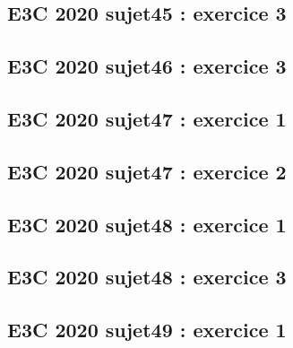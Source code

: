 \documentclass[lang=fr,edition=teacher,layout=sheet]{mxbook}
\begin{document}
\begingroup\endgroup
\par\bigskip
{}\subsection*{E3C 2020 sujet45 : exercice 3}
\begingroup\endgroup
\par\bigskip
{}\subsection*{E3C 2020 sujet46 : exercice 3}
\begingroup\endgroup
\par\bigskip
{}\subsection*{E3C 2020 sujet47 : exercice 1}
\begingroup\endgroup
\par\bigskip
{}\subsection*{E3C 2020 sujet47 : exercice 2}
\begingroup\endgroup
\par\bigskip
{}\subsection*{E3C 2020 sujet48 : exercice 1}
\begingroup\endgroup
\par\bigskip
{}\subsection*{E3C 2020 sujet48 : exercice 3}
\begingroup\endgroup
\par\bigskip
{}\subsection*{E3C 2020 sujet49 : exercice 1}
\begingroup\endgroup
\end{document}
